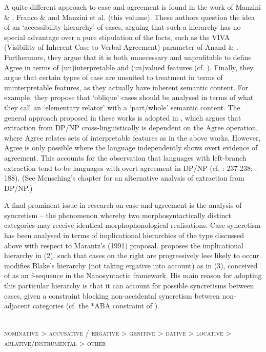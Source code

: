\documentclass[output=paper]{langsci/langscibook}
\begin{document}
A quite different approach to case and agreement is found in the work of Manzini \& \citet{Franco2016}, Franco \& \citet{Manzini2017} and Manzini et al. (this volume). These authors question the idea of an ‘accessibility hierarchy’ of cases, arguing that such a hierarchy has no special advantage over a pure stipulation of the facts, such as the VIVA (Visibility of Inherent Case to Verbal Agreement) parameter of Anand \& \citet{Nevins2006}. Furthermore, they argue that it is both unnecessary and unprofitable to define Agree in terms of (un)interpretable and (un)valued features (cf. \citealt{Brody1997}). Finally, they argue that certain types of case are unsuited to treatment in terms of uninterpretable features, as they actually have inherent semantic content. For example, they propose that ‘oblique’ cases should be analysed in terms of what they call an ‘elementary relator’ with a ‘part/whole’ semantic content. The general approach proposed in these works is adopted in \citet{Reeve2018}, which argues that extraction from DP/NP cross-linguistically is dependent on the Agree operation, where Agree relates sets of interpretable features as in the above works. However, Agree is only possible where the language independently shows overt evidence of agreement. This accounts for the observation that languages with left-branch extraction tend to be languages with overt agreement in DP/NP (cf. \citealt{Ross1967}: 237-238; \citealt{Horn1983}: 188). (See Mensching’s chapter for an alternative analysis of extraction from DP/NP.)

A final prominent issue in research on case and agreement is the analysis of syncretism – the phenomenon whereby two morphosyntactically distinct categories may receive identical morphophonological realisations. Case syncretism has been analysed in terms of implicational hierarchies of the type discussed above with respect to Marantz’s (1991) proposal. \citet{Blake2001} proposes the implicational hierarchy in (2), such that cases on the right are progressively less likely to occur. \citet{Caha2009} modifies Blake’s hierarchy (not taking ergative into account) as in (3), conceived of as an f-sequence in the Nanosyntactic framework. His main reason for adopting this particular hierarchy is that it can account for possible syncretisms between cases, given a constraint blocking non-accidental syncretism between non-adjacent categories (cf. the *ABA constraint of \citealt{Bobaljik2012}).

\ea%
\label{ex:intro:2}\citep[156]{Blake2001}\\
\textsc{nominative > accusative / ergative > genitive > dative > locative > ablative/instrumental > other}    
 \z
\end{document}
